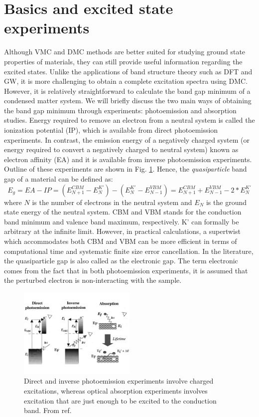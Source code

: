 \section{Basics and excited state experiments}
Although VMC and DMC methods are better suited for studying ground state properties of materials, they can still provide useful information regarding the excited states. 
Unlike the applications of band structure theory such as DFT and GW, it is more challenging to obtain a complete excitation spectra using DMC. 
However, it is relatively straightforward to calculate the band gap minimum of a condensed matter system. 
We will briefly discuss the two main ways of obtaining the band gap minimum through experiments: photoemission and absorption studies.  
Energy required to remove an electron from a neutral system is called the ionization potential (IP), which is available from direct photoemission experiments. 
In contrast, the emission energy of a negatively charged system (or energy required to convert a negatively charged to neutral system) known as electron affinity (EA) and it is available from inverse photoemission experiments. 
Outline of these experiments are shown in Fig. \ref{fig:lab5_exp}. Hence, the \textit{quasiparticle} band gap of a material can be defined as:
\begin{equation}
	E_g=EA-IP=(E_{N+1}^{CBM}-E_{N}^{K'})-(E_{N}^{K'}-E_{N-1}^{VBM})=E_{N+1}^{CBM}+E_{N-1}^{VBM}-2*E_{N}^{K'}\label{eq:qp}
\end{equation}
where $N$ is the number of electrons in the neutral system and $E_{N}$ is the ground state energy of the neutral system. 
CBM and VBM stands for the conduction band minimum and valence band maximum, respectively. K' can formally be arbitrary at the infinite limit.
However, in practical calculations, a supertwist which accommodates both CBM and VBM can be more efficient in terms of computational time and systematic finite size error cancellation. 
In the literature, the quasiparticle gap is also called as the electronic gap. 
The term electronic comes from the fact that in both photoemission experiments, it is assumed that the perturbed electron is non-interacting with the sample. 

\begin{figure}
	\centering
	\includegraphics[width=0.5\textwidth]{./figures/lab_excited_experiments}
	\caption{Direct and inverse photoemission experiments involve charged excitations, whereas optical absorption experiments involves excitation that are just enough to be excited to the conduction band. From ref. \cite{Onida2002a}}
	\label{fig:lab5_exp}
\end{figure}

